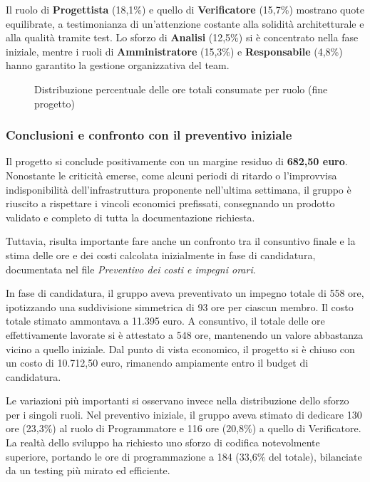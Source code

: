 \documentclass[11pt,a4paper]{article}
\begin{document}
Il ruolo di \textbf{Progettista} (18,1\%) e quello di \textbf{Verificatore} (15,7\%) mostrano quote equilibrate, a testimonianza di un'attenzione costante alla solidità architetturale e alla qualità tramite test. Lo sforzo di \textbf{Analisi} (12,5\%) si è concentrato nella fase iniziale, mentre i ruoli di \textbf{Amministratore} (15,3\%) e \textbf{Responsabile} (4,8\%) hanno garantito la gestione organizzativa del team.

\begin{figure}[H]
    \centering
    \caption{Distribuzione percentuale delle ore totali consumate per ruolo (fine progetto)}
    \label{fig:torta_ruoli_finale}
\end{figure}


\subsubsection{Conclusioni e confronto con il preventivo iniziale}
Il progetto si conclude positivamente con un margine residuo di \textbf{682,50 euro}. Nonostante le criticità emerse, come alcuni periodi di ritardo o l'improvvisa indisponibilità dell'infrastruttura proponente nell'ultima settimana, il gruppo è riuscito a rispettare i vincoli economici prefissati, consegnando un prodotto validato e completo di tutta la documentazione richiesta.

Tuttavia, risulta importante fare anche un confronto tra il consuntivo finale e la stima delle ore e dei costi calcolata inizialmente in fase di candidatura, documentata nel file \textit{Preventivo dei costi e impegni orari}. 

In fase di candidatura, il gruppo aveva preventivato un impegno totale di 558 ore, ipotizzando una suddivisione simmetrica di 93 ore per ciascun membro. Il costo totale stimato ammontava a 11.395 euro. A consuntivo, il totale delle ore effettivamente lavorate si è attestato a 548 ore, mantenendo un valore abbastanza vicino a quello iniziale.
Dal punto di vista economico, il progetto si è chiuso con un costo di 10.712,50 euro, rimanendo ampiamente entro il budget di candidatura.

Le variazioni più importanti si osservano invece nella distribuzione dello sforzo per i singoli ruoli. Nel preventivo iniziale, il gruppo aveva stimato di dedicare 130 ore (23,3\%) al ruolo di Programmatore e 116 ore (20,8\%) a quello di Verificatore. La realtà dello sviluppo ha richiesto uno sforzo di codifica notevolmente superiore, portando le ore di programmazione a 184 (33,6\% del totale), bilanciate da un testing più mirato ed efficiente.
\end{document}
